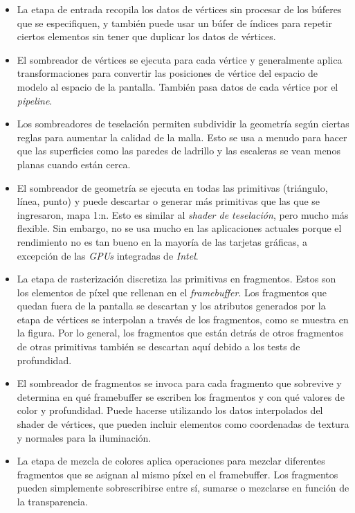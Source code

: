 \documentclass[a4paper]{book}
\begin{document}
\begin{itemize}
  \item La etapa de entrada recopila los datos de vértices sin procesar de los búferes que
  se especifiquen, y también puede usar un búfer de índices para repetir ciertos elementos sin tener
  que duplicar los datos de vértices.

  \item El sombreador de vértices se ejecuta para cada vértice y generalmente aplica transformaciones
  para convertir las posiciones de vértice del espacio de modelo al espacio de la pantalla. También pasa
  datos de cada vértice por el \textit{pipeline}.

  \item Los sombreadores de teselación permiten subdividir la geometría según ciertas reglas para aumentar
  la calidad de la malla. Esto se usa a menudo para hacer que las superficies como las paredes de ladrillo
  y las escaleras se vean menos planas cuando están cerca.

  \item El sombreador de geometría se ejecuta en todas las primitivas (triángulo, línea, punto) y puede
  descartar o generar más primitivas que las que se ingresaron, mapa 1:n. Esto es similar al \textit{shader de teselación},
  pero mucho más flexible. Sin embargo, no se usa mucho en las aplicaciones actuales porque el rendimiento no es
  tan bueno en la mayoría de las tarjetas gráficas, a excepción de las \textit{GPUs} integradas de \textit{Intel}.

  \item La etapa de rasterización discretiza las primitivas en fragmentos. Estos son los elementos de píxel
  que rellenan en el \textit{framebuffer}. Los fragmentos que quedan fuera de la pantalla se descartan y los atributos
  generados por la etapa de vértices se interpolan a través de los fragmentos, como se muestra en la figura.
  Por lo general, los fragmentos que están detrás de otros fragmentos de otras primitivas también se descartan
  aquí debido a los tests de profundidad.

  \item El sombreador de fragmentos se invoca para cada fragmento que sobrevive y determina en qué framebuffer
  se escriben los fragmentos y con qué valores de color y profundidad. Puede hacerse utilizando los datos interpolados
  del shader de vértices, que pueden incluir elementos como coordenadas de textura y normales para la iluminación.

  \item La etapa de mezcla de colores aplica operaciones para mezclar diferentes fragmentos que se asignan al mismo píxel
  en el framebuffer. Los fragmentos pueden simplemente sobrescribirse entre sí, sumarse o mezclarse en función de la transparencia.

\end{itemize}
\end{document}
